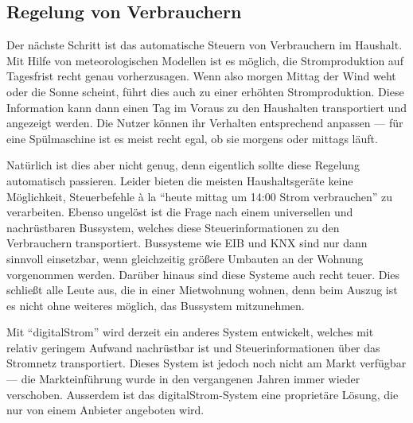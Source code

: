 \documentclass[logo]{fhgart}
\begin{document}
\subsection{Regelung von Verbrauchern}\label{sub:steuern}

Der nächste Schritt ist das automatische Steuern von Verbrauchern im
Haushalt. Mit Hilfe von meteorologischen Modellen ist es möglich, die
Stromproduktion auf Tagesfrist recht genau vorherzusagen. Wenn also
morgen Mittag der Wind weht oder die Sonne scheint, führt dies auch zu
einer erhöhten Stromproduktion. Diese Information kann dann einen Tag im
Voraus zu den Haushalten transportiert und angezeigt werden. Die Nutzer
können ihr Verhalten entsprechend anpassen --- für eine Spülmaschine ist
es meist recht egal, ob sie morgens oder mittags läuft.

Natürlich ist dies aber nicht genug, denn eigentlich sollte diese
Regelung automatisch passieren. Leider bieten die meisten
Haushaltsgeräte keine Möglichkeit, Steuerbefehle à la "`heute mittag um
14:00 Strom verbrauchen"' zu verarbeiten. Ebenso ungelöst ist die Frage
nach einem universellen und nachrüstbaren Bussystem, welches diese
Steuerinformationen zu den Verbrauchern transportiert. Bussysteme wie
EIB und KNX sind nur dann sinnvoll einsetzbar, wenn gleichzeitig größere
Umbauten an der Wohnung vorgenommen werden. Darüber hinaus sind diese
Systeme auch recht teuer. Dies schließt alle Leute aus, die in einer
Mietwohnung wohnen, denn beim Auszug ist es nicht ohne weiteres
möglich, das Bussystem mitzunehmen.

Mit "`digitalStrom"' wird derzeit ein anderes System entwickelt, welches
mit relativ geringem Aufwand nachrüstbar ist und Steuerinformationen
über das Stromnetz transportiert. Dieses System ist jedoch noch nicht am
Markt verfügbar --- die Markteinführung wurde in den vergangenen Jahren
immer wieder verschoben. Ausserdem ist das digitalStrom-System eine
proprietäre Lösung, die nur von einem Anbieter angeboten wird. 
\end{document}
